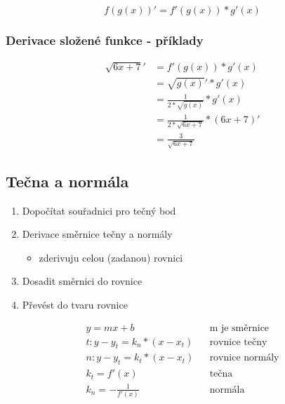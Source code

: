 $$f(g(x))' = f'(g(x))*g'(x)$$
\subsubsection{Derivace složené funkce - příklady}
\begin{align*}
  \sqrt{6x+7}' &= f'(g(x))*g'(x)\\
  &= \sqrt{g(x)}'*g'(x)\\
  &= \frac{1}{2*\sqrt{g(x)}}*g'(x)\\
  &= \frac{1}{2*\sqrt{6x+7}}*(6x+7)'\\
  &= \frac{3}{\sqrt{6x+7}}
\end{align*}
\subsection{Tečna a normála}
\begin{enumerate}
  \item Dopočítat souřadnici pro tečný bod
  \item Derivace směrnice tečny a normály
    \begin{itemize}
      \item zderivuju celou (zadanou) rovnici
    \end{itemize}
  \item Dosadit směrnici do rovnice
  \item Převést do tvaru rovnice
\end{enumerate}
\begin{eqnarray*}
  y = mx+b & & \text{m je směrnice} \\
  t: y-y_t=k_n*(x-x_t) & & \text{rovnice tečny} \\
  n: y-y_t=k_t*(x-x_t) & & \text{rovnice normály} \\
  k_t = f'(x) & & \text{tečna} \\
  k_n = -\frac{1}{f'(x)} & & \text{normála}
\end{eqnarray*}

